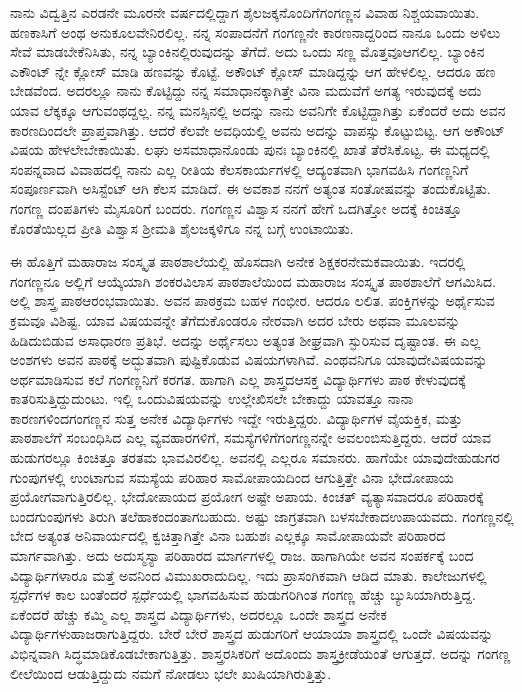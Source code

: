 {ನಾನು ವಿದ್ವತ್ತಿನ ಎರಡನೇ ಮೂರನೇ ವರ್ಷದಲ್ಲಿದ್ದಾಗ ಶೈಲಜಕ್ಕನೊಂದಿಗೆ\break ಗಂಗಣ್ಣನ ವಿವಾಹ ನಿಶ್ಚಯವಾಯಿತು. ಹಣಕಾಸಿಗೆ ಅಂಥ ಅನುಕೂಲವೇನಿರಲಿಲ್ಲ. ನನ್ನ ಸಂಪಾದನೆಗೆ ಗಂಗಣ್ಣನೇ ಕಾರಣನಾದ್ದರಿಂದ ನಾನೂ ಒಂದು ಅಳಿಲು ಸೇವೆ ಮಾಡ\-ಬೇಕೆನಿಸಿತು, ನನ್ನ ಬ್ಯಾಂಕಿನಲ್ಲಿರುವುದನ್ನು ತೆಗೆದೆ. ಅದು ಒಂದು ಸಣ್ಣ ಮೊತ್ತವೂ\break ಆಗಲಿಲ್ಲ. ಬ್ಯಾಂಕಿನ ಎಕೌಂಟ್ ನ್ನೇ ಕ್ಲೋಸ್ ಮಾಡಿ ಹಣವನ್ನು ಕೊಟ್ಟೆ. ಅಕೌಂಟ್ ಕ್ಲೋಸ್ ಮಾಡಿದ್ದನ್ನು ಆಗ ಹೇಳಲಿಲ್ಲ. ಆದರೂ ಹಣ ಬೇಡವೆಂದ. ಅದರಲ್ಲೂ ನಾನು ಕೊಟ್ಟಿದ್ದು ನನ್ನ ಸಮಾಧಾನಕ್ಕಾಗಿತ್ತೇ ವಿನಾ ಮದುವೆಗೆ ಅಗತ್ಯ ಇರುವುದಕ್ಕೆ ಅದು ಯಾವ ಲೆಕ್ಕಕ್ಕೂ ಆಗುವಂಥದ್ದಲ್ಲ. ನನ್ನ ಮನಸ್ಸಿನಲ್ಲಿ ಅದನ್ನು ನಾನು ಅವನಿಗೇ ಕೊಟ್ಟಿದ್ದಾಗಿತ್ತು ಏಕೆಂದರೆ ಅದು ಅವನ ಕಾರಣದಿಂದಲೇ ಪ್ರಾಪ್ತವಾಗಿತ್ತು. ಆದರೆ ಕೆಲವೇ ಅವಧಿಯಲ್ಲಿ ಅವನು ಅದನ್ನು ವಾಪಸ್ಸು ಕೊಟ್ಟುಬಿಟ್ಟ. ಆಗ ಅಕೌಂಟ್ ವಿಷಯ ಹೇಳಲೇಬೇಕಾಯಿತು. ಲಘು ಅಸಮಾಧಾನೊಂಡು ಪುನಃ ಬ್ಯಾಂಕಿನಲ್ಲಿ ಖಾತೆ ತೆರೆಸಿಕೊಟ್ಟ.  ಈ ಮಧ್ಯದಲ್ಲಿ ಸಂಪನ್ನವಾದ ವಿವಾಹದಲ್ಲಿ ನಾನು ಎಲ್ಲ ರೀತಿಯ ಕೆಲಸ\enginline{-}ಕಾರ್ಯಗಳಲ್ಲಿ ಆದ್ಯಂತವಾಗಿ ಭಾಗವಹಿಸಿ ಗಂಗಣ್ಣನಿಗೆ ಸಂಪೂರ್ಣವಾಗಿ ಅಸಿಸ್ಟೆಂಟ್ ಆಗಿ ಕೆಲಸ ಮಾಡಿದೆ. ಈ ಅವಕಾಶ ನನಗೆ ಅತ್ಯಂತ ಸಂತೋಷವನ್ನು ತಂದುಕೊಟ್ಟಿತು. ಗಂಗಣ್ಣ ದಂಪತಿಗಳು ಮೈಸೂರಿಗೆ ಬಂದರು. ಗಂಗಣ್ಣನ ವಿಶ್ವಾಸ ನನಗೆ ಹೇಗೆ ಒದಗಿತ್ತೋ ಅದಕ್ಕೆ ಕಿಂಚಿತ್ತೂ ಕೊರತೆಯಿಲ್ಲದ ಪ್ರೀತಿ ವಿಶ್ವಾಸ ಶ್ರೀಮತಿ ಶೈಲಜಕ್ಕಳಿಗೂ ನನ್ನ ಬಗ್ಗೆ ಉಂಟಾಯಿತು.

ಈ ಹೊತ್ತಿಗೆ ಮಹಾರಾಜ ಸಂಸ್ಕೃತ ಪಾಠಶಾಲೆಯಲ್ಲಿ ಹೊಸದಾಗಿ ಅನೇಕ ಶಿಕ್ಷಕರ\break ನೇಮಕವಾಯಿತು. ಇದರಲ್ಲಿ ಗಂಗಣ್ಣನೂ ಅಲ್ಲಿಗೆ ಆಯ್ಕೆಯಾಗಿ ಶಂಕರವಿಲಾಸ ಪಾಠಶಾಲೆಯಿಂದ ಮಹಾರಾಜ ಸಂಸ್ಕೃತ ಪಾಠಶಾಲೆಗೆ ಆಗಮಿಸಿದ. ಅಲ್ಲಿ ಶಾಸ್ತ್ರ ಪಾಠ\break ಆರಂಭವಾಯಿತು. ಅವನ ಪಾಠಕ್ರಮ ಬಹಳ ಗಂಭೀರ. ಆದರೂ ಲಲಿತ. ಪಂಕ್ತಿಗಳನ್ನು ಅರ್ಥೈಸುವ ಕ್ರಮವೂ ವಿಶಿಷ್ಟ. ಯಾವ ವಿಷಯವನ್ನೇ ತೆಗೆದುಕೊಂಡರೂ ನೇರವಾಗಿ ಅದರ ಬೇರು ಅಥವಾ ಮೂಲವನ್ನು ಹಿಡಿದುಬಿಡುವ ಅಸಾಧಾರಣ ಪ್ರತಿಭೆ. ಅದನ್ನು ಅರ್ಥೈಸಲು ಅತ್ಯಂತ ಶೀಘ್ರವಾಗಿ ಸ್ಫುರಿಸುವ ದೃಷ್ಟಾಂತ. ಈ ಎಲ್ಲ ಅಂಶಗಳು ಅವನ ಪಾಠಕ್ಕೆ ಅದ್ಭುತವಾಗಿ ಪುಷ್ಟಿಕೊಡುವ ವಿಷಯಗಳಾಗಿವೆ. ಎಂಥವನಿಗೂ ಯಾವುದೇ\break ವಿಷಯವನ್ನು ಅರ್ಥಮಾಡಿಸುವ ಕಲೆ ಗಂಗಣ್ಣನಿಗೆ ಕರಗತ. ಹಾಗಾಗಿ ಎಲ್ಲ ಶಾಸ್ತ್ರದ\break ಆಸಕ್ತ ವಿದ್ಯಾರ್ಥಿಗಳು ಪಾಠ ಕೇಳುವುದಕ್ಕೆ ಕಾತರಿಸುತ್ತಿದ್ದುದುಂಟು. ಇಲ್ಲಿ ಒಂದು\break ವಿಷಯವನ್ನು ಉಲ್ಲೇಖಿಸಲೇ ಬೇಕಾದ್ದು \enginline{-} ಯಾವತ್ತೂ ನಾನಾ ಕಾರಣಗಳಿಂದ\break ಗಂಗಣ್ಣನ ಸುತ್ತ ಅನೇಕ ವಿದ್ಯಾರ್ಥಿಗಳು ಇದ್ದೇ ಇರುತ್ತಿದ್ದರು. ವಿದ್ಯಾರ್ಥಿಗಳ ವೈಯಕ್ತಿಕ, ಮತ್ತು ಪಾಠಶಾಲೆಗೆ ಸಂಬಂಧಿಸಿದ ಎಲ್ಲ ವ್ಯವಹಾರಗಳಿಗೆ, ಸಮಸ್ಯೆಗಳಿಗೆ\break ಗಂಗಣ್ಣನನ್ನೇ ಅವಲಂಬಿಸುತ್ತಿದ್ದರು. ಆದರೆ ಯಾವ ಹುಡುಗರಲ್ಲೂ ಕಿಂಚಿತ್ತೂ ತರತಮ ಭಾವ\-ವಿರಲಿಲ್ಲ. ಅವನಲ್ಲಿ ಎಲ್ಲರೂ ಸಮಾನರು. ಹಾಗೆಯೇ ಯಾವುದೇ\break ಹುಡುಗರ ಗುಂಪುಗಳಲ್ಲಿ ಉಂಟಾಗುವ ಸಮಸ್ಯೆಯ ಪರಿಹಾರ ಸಾಮೋಪಾಯದಿಂದ ಆಗುತ್ತಿತ್ತೇ ವಿನಾ ಭೇದೋಪಾಯ ಪ್ರಯೋಗವಾಗುತ್ತಿರಲಿಲ್ಲ. ಭೇದೋಪಾಯದ ಪ್ರಯೋಗ ಅಷ್ಟೇ ಅಪಾಯ. ಕಿಂಚತ್ ವ್ಯತ್ಯಾಸವಾದರೂ  ಪರಿಹಾರಕ್ಕೆ ಬಂದ\break ಗುಂಪುಗಳು ತಿರುಗಿ ತಲೆ\-ಹಾಕಂದಂತಾಗಬಹುದು. ಅಷ್ಟು ಜಾಗ್ರತವಾಗಿ ಬಳಸಬೇಕಾದ\break ಉಪಾಯವದು. ಗಂಗಣ್ಣನಲ್ಲಿ ಬೇದ ಅತ್ಯಂತ ಅನಿವಾರ್ಯದಲ್ಲಿ ಕ್ವಚಿತ್ತಾಗಿತ್ತೇ ವಿನಾ ಬಹುಶಃ ಎಲ್ಲಕ್ಕೂ ಸಾಮೋಪಾಯವೇ ಪರಿಹಾರದ ಮಾರ್ಗವಾಗಿತ್ತು. ಅದು ಅದು\break ಸ್ಮಸ್ಯಾ ಪರಿಹಾರದ  ಮಾರ್ಗಗಳಲ್ಲಿ ರಾಜ. ಹಾಗಾಗಿಯೇ ಅವನ ಸಂಪರ್ಕಕ್ಕೆ ಬಂದ ವಿದ್ಯಾರ್ಥಿಗಳಾರೂ ಮತ್ತೆ ಅವನಿಂದ ವಿಮುಖರಾದುದಿಲ್ಲ. ಇದು ಪ್ರಾಸಂಗಿಕವಾಗಿ ಆಡಿದ ಮಾತು.  ಕಾಲೇಜುಗಳಲ್ಲಿ  ಸ್ಪರ್ಧೆಗಳ ಕಾಲ ಬಂತೆಂದರೆ ಸ್ಪರ್ಧೆಯಲ್ಲಿ ಭಾಗ\-ವಹಿಸುವ ಹುಡುಗರಿಗಿಂತ ಗಂಗಣ್ಣ ಹೆಚ್ಚು ಬ್ಯುಸಿಯಾಗಿರುತ್ತಿದ್ದ. ಏಕೆಂದರೆ ಹೆಚ್ಚು ಕಮ್ಮಿ ಎಲ್ಲ ಶಾಸ್ತ್ರದ ವಿದ್ಯಾರ್ಥಿಗಳು, ಅದರಲ್ಲೂ ಒಂದೇ ಶಾಸ್ತ್ರದ ಅನೇಕ ವಿದ್ಯಾರ್ಥಿಗಳು\break ಹಾಜರಾಗುತ್ತಿದ್ದರು. ಬೇರೆ ಬೇರೆ ಶಾಸ್ತ್ರದ ಹುಡುಗರಿಗೆ ಆಯಾಯಾ ಶಾಸ್ತ್ರದಲ್ಲಿ ಒಂದೇ ವಿಷಯವನ್ನು ವಿಭಿನ್ನವಾಗಿ ಸಿದ್ಧಮಾಡಿಕೊಡಬೇಕಾಗುತ್ತಿತ್ತು. ಶಾಸ್ತ್ರರಸಿಕರಿಗೆ ಅದೊಂದು ಶಾಸ್ತ್ರಕ್ರೀಡೆಯಂತೆ ಆಗುತ್ತದೆ. ಅದನ್ನು ಗಂಗಣ್ಣ ಲೀಲೆಯಿಂದ  ಆಡುತ್ತಿದ್ದುದು ನಮಗೆ ನೋಡಲು ಭಲೇ ಖುಷಿಯಾಗಿರುತ್ತಿತ್ತು.

}
